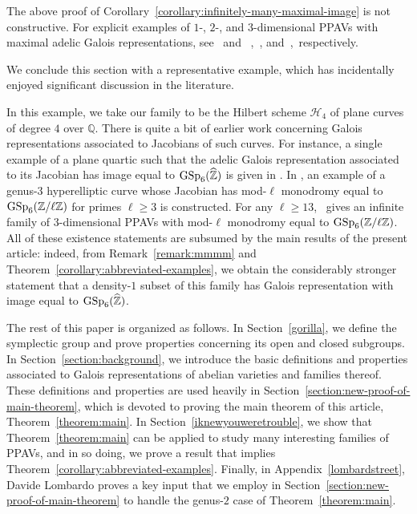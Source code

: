 \begin{remark}
The above proof of Corollary~\ref{corollary:infinitely-many-maximal-image} is not constructive. For explicit examples of $1$-, $2$-, and $3$-dimensional PPAVs with maximal adelic Galois representations, see~\cite[Theorem 1.5]{greasy} and ~\cite[Sections 5.5.6-8]{causalrelationship},~\cite{landesman-swaminathan-tao-xu:hyperelliptic-curves}, \mbox{and~\cite[Theorem 1.1]{seaweed}, respectively.}
\end{remark}

We conclude this section with a representative example, which has incidentally enjoyed
significant discussion in the literature.

\begin{example}
	\label{example:}
	In this example, we take our family to be the Hilbert scheme $\mathscr H_4$ of plane
	curves of degree $4$ over $\mathbb Q$. There is quite a bit of earlier work concerning Galois representations associated to Jacobians of such curves. For instance, a single example of a plane quartic
	such that the adelic Galois representation associated to its Jacobian has image
	equal to $\operatorname{GSp}_6(\widehat{\mathbb Z})$
	is given in \cite[Theorem 1.1]{seaweed}.
	In \cite[Corollary 1.1]{anni2016residual},
	an example of a genus-$3$ hyperelliptic curve
	whose Jacobian has mod-$\ell$ monodromy equal to $\operatorname{GSp}_6(\mathbb Z/\ell \mathbb Z)$
	for primes $\ell \geq 3$ is constructed.
	For any $\ell \geq 13$,~\cite[Theorem 0.1]{arias2015large}
	gives
	an infinite family of $3$-dimensional PPAVs with mod-$\ell$
	monodromy equal to $\operatorname{GSp}_6(\mathbb Z/\ell \mathbb Z)$. All of these existence statements are subsumed by the main results of the present article: indeed, from Remark~\ref{remark:mmmm} and
	Theorem~\ref{corollary:abbreviated-examples},
	we obtain the considerably stronger statement that a density-$1$ subset of this family
	has Galois representation
	with image equal to $\operatorname{GSp}_6(\widehat{\mathbb Z})$.
\end{example}

The rest of this paper is organized as follows. In Section~\ref{gorilla}, we define the symplectic group and prove properties concerning its open and closed subgroups. In Section~\ref{section:background}, we introduce the basic definitions and properties associated to Galois representations of abelian varieties and families thereof. These definitions and properties are used heavily in Section~\ref{section:new-proof-of-main-theorem}, which is devoted to proving the main theorem of this article, Theorem~\ref{theorem:main}. In Section~\ref{iknewyouweretrouble}, we show that Theorem~\ref{theorem:main} can be applied to study many interesting families of PPAVs, and in so doing, we prove a result that implies Theorem~\ref{corollary:abbreviated-examples}.
Finally, in Appendix~\ref{lombardstreet}, Davide Lombardo proves a key input that we employ in Section~\ref{section:new-proof-of-main-theorem} to handle the genus-$2$ case of Theorem~\ref{theorem:main}.
